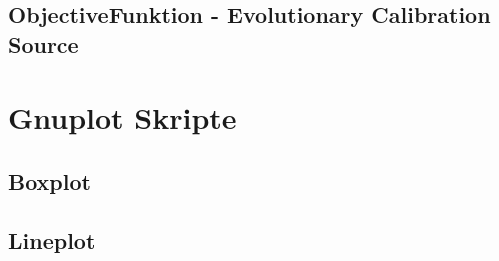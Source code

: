 \begin{appendix}

\label{app:EvolutionaryCalibration1}
\newpage

\section{ObjectiveFunktion - Evolutionary Calibration Source}

\label{app:EvolutionaryCalibration2}
\newpage
%
\chapter{Gnuplot Skripte}
\section{Boxplot}
\tiny

\label{append_Script_Box-plot}
\newpage
%
\section{Lineplot}
\tiny 
%

\label{append_Script_Line-plot}
\newpage

\end{appendix}
